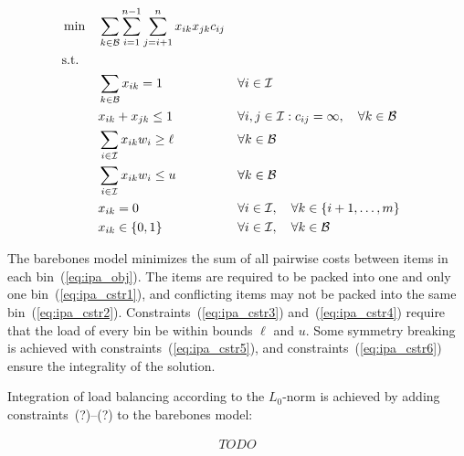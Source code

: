 \documentclass{llncs}
\begin{document}
\begin{align}
  & \min && \sum \limits_{k \in \mathcal{B}} \sum \limits_{i=1}^{n-1} \sum \limits_{j=i+1}^{n} x_{ik}x_{jk}c_{ij}                               \label{eq:ipa_obj}   \\
  & \textrm{s.t.}                                                                                                                               \notag               \\
  &&& \sum \limits_{k \in \mathcal{B}} x_{ik} = 1             && \forall i \in \mathcal{I}                                                      \label{eq:ipa_cstr1} \\
  &&& x_{ik} + x_{jk} \leq 1                                  && \forall i,j \in \mathcal{I} : c_{ij} = \infty, \quad \forall k \in \mathcal{B} \label{eq:ipa_cstr2} \\
  &&& \sum \limits_{i \in \mathcal{I}} x_{ik} w_{i} \geq \ell && \forall k \in \mathcal{B}                                                      \label{eq:ipa_cstr3} \\
  &&& \sum \limits_{i \in \mathcal{I}} x_{ik} w_{i} \leq u    && \forall k \in \mathcal{B}                                                      \label{eq:ipa_cstr4} \\
  &&& x_{ik} = 0                                              && \forall i \in \mathcal{I}, \quad \forall k \in \{i+1, \dots, m\}               \label{eq:ipa_cstr5} \\
  &&& x_{ik} \in \{0, 1\}                                     && \forall i \in \mathcal{I}, \quad \forall k \in \mathcal{B}                     \label{eq:ipa_cstr6}
\end{align}

The barebones model minimizes the sum of all pairwise costs between items in each bin~(\ref{eq:ipa_obj}). The items are required to be packed into one and only one bin~(\ref{eq:ipa_cstr1}), and conflicting items may not be packed into the same bin~(\ref{eq:ipa_cstr2}). Constraints~(\ref{eq:ipa_cstr3}) and~(\ref{eq:ipa_cstr4}) require that the load of every bin be within bounds $\ell$ and $u$. Some symmetry breaking is achieved with constraints~(\ref{eq:ipa_cstr5}), and constraints~(\ref{eq:ipa_cstr6}) ensure the integrality of the solution.

Integration of load balancing according to the $L_{0}$-norm is achieved by adding constraints~(?)--(?) to the barebones model:

\begin{align}
  TODO
\end{align}
\end{document}
